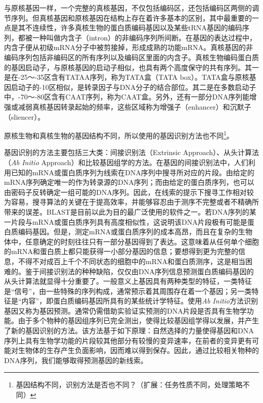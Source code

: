 \documentclass[11pt,a4paper,twoside]{book}
\begin{document}
与原核基因一样，一个完整的真核基因，不仅包括编码区，还包括编码区两侧的调节序列。但真核基因和原核基因在结构上存在着许多基本的区别，其中最重要的一点是其不连续性，许多真核生物的蛋白质编码基因以及某些tRNA基因的编码序列，都被一种叫做内含子（intron）的非编码序列所间断。在基因的表达过程中，内含子便从初级mRNA分子中被剪接掉，形成成熟的功能mRNA。真核基因的非编码序列包括非编码区的所有序列以及编码区里面的内含子。真核生物编码蛋白质的基因启动子，与原核基因的启动子相似，也具有两个高度保守的共有序列。其一是在-25～-35区含有TATAA序列，称为TATA盒（TATA box）。TATA盒与原核基因启动子的-10区相似，是转录因子与DNA分子的结合部位。其二是在多数启动子中，-70～-80区含有CAAT序列，称为CAAT盒。另外，还有一部分DNA序列能增强或减弱真核基因转录起始的频率，这些区域称为增强子（enhancer）和沉默子（sliencer）。

原核生物和真核生物的基因结构不同，所以使用的基因识别方法也不同\footnote{基因结构不同，识别方法是否也不同？（扩展：任务性质不同，处理策略不同）}。

基因识别的方法主要包括三大类：间接识别法（Extrinsic Approach）、从头计算法（\textit{Ab Initio} Approach）和比较基因组学的方法。在基因的间接识别法中，人们利用已知的mRNA或蛋白质序列为线索在DNA序列中搜寻所对应的片段。由给定的mRNA序列确定唯一的作为转录源的DNA序列；而由给定的蛋白质序列，也可以由密码子反转确定一组可能的DNA序列。因此，在线索的提示下搜寻工作相对较为容易，搜寻算法的关键在于提高效率，并能够容忍由于测序不完整或者不精确所带来的误差。BLAST是目前以此为目的最广泛使用的软件之一。若DNA序列的某一片段与mRNA或蛋白质序列具有高度相似性，这说明该DNA片段极有可能是蛋白质编码基因。但是，测定mRNA或蛋白质序列的成本高昂，而且在复杂的生物体中，任意确定的时刻往往只有一部分基因得到了表达。这意味着从任何单个细胞的mRNA和蛋白质上都只能获得一小部分基因的信息；要想得到更为完整的信息，不得不对成百上千个不同状态的细胞中的mRNA和蛋白质测序，这是相当困难的。鉴于间接识别法的种种缺陷，仅仅由DNA序列信息预测蛋白质编码基因的从头计算法就显得十分重要了。一般意义上基因具有两种类型的特征，一类特征是“信号”，由一些特殊的序列构成，通常预示着其周围存在着一个基因；另一类特征是“内容”，即蛋白质编码基因所具有的某些统计学特征。使用\textit{Ab Initio}方法识别基因又称为基因预测。通常仍需借助实验证实预测的DNA片段是否具有生物学功能。由于多个物种的基因组序列已完全测出，使得比较基因组学得以发展，并产生了新的基因识别的方法。该方法基于如下原理：自然选择的力量使得基因和DNA序列上具有生物学功能的片段较其他部分有较慢的变异速率，在前者的变异更有可能对生物体的生存产生负面影响，因而难以得到保存。因此，通过比较相关物种的DNA序列，我们能够取得预测基因的新线索。
\end{document}
